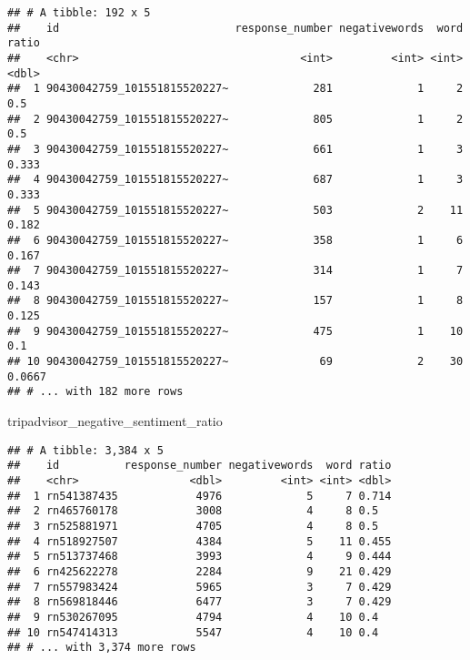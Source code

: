 \documentclass[]{article}
\newenvironment{Shaded}{\begin{snugshade}}{\end{snugshade}}
\newcommand{\KeywordTok}[1]{\textcolor[rgb]{0.13,0.29,0.53}{\textbf{#1}}}
\newcommand{\DataTypeTok}[1]{\textcolor[rgb]{0.13,0.29,0.53}{#1}}
\newcommand{\DecValTok}[1]{\textcolor[rgb]{0.00,0.00,0.81}{#1}}
\newcommand{\StringTok}[1]{\textcolor[rgb]{0.31,0.60,0.02}{#1}}
\newcommand{\OperatorTok}[1]{\textcolor[rgb]{0.81,0.36,0.00}{\textbf{#1}}}
\newcommand{\NormalTok}[1]{#1}
\begin{document}
\begin{verbatim}
## # A tibble: 192 x 5
##    id                           response_number negativewords  word  ratio
##    <chr>                                  <int>         <int> <int>  <dbl>
##  1 90430042759_101551815520227~             281             1     2 0.5   
##  2 90430042759_101551815520227~             805             1     2 0.5   
##  3 90430042759_101551815520227~             661             1     3 0.333 
##  4 90430042759_101551815520227~             687             1     3 0.333 
##  5 90430042759_101551815520227~             503             2    11 0.182 
##  6 90430042759_101551815520227~             358             1     6 0.167 
##  7 90430042759_101551815520227~             314             1     7 0.143 
##  8 90430042759_101551815520227~             157             1     8 0.125 
##  9 90430042759_101551815520227~             475             1    10 0.1   
## 10 90430042759_101551815520227~              69             2    30 0.0667
## # ... with 182 more rows
\end{verbatim}

\begin{Shaded}
\begin{Highlighting}[]
\NormalTok{tripadvisor_negative_sentiment_ratio}
\end{Highlighting}
\end{Shaded}

\begin{verbatim}
## # A tibble: 3,384 x 5
##    id          response_number negativewords  word ratio
##    <chr>                 <dbl>         <int> <int> <dbl>
##  1 rn541387435            4976             5     7 0.714
##  2 rn465760178            3008             4     8 0.5  
##  3 rn525881971            4705             4     8 0.5  
##  4 rn518927507            4384             5    11 0.455
##  5 rn513737468            3993             4     9 0.444
##  6 rn425622278            2284             9    21 0.429
##  7 rn557983424            5965             3     7 0.429
##  8 rn569818446            6477             3     7 0.429
##  9 rn530267095            4794             4    10 0.4  
## 10 rn547414313            5547             4    10 0.4  
## # ... with 3,374 more rows
\end{verbatim}

\begin{Shaded}
\end{Shaded}
\end{document}
